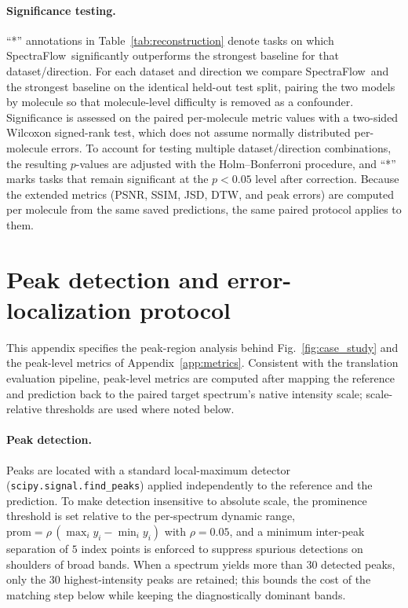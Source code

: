 \documentclass[pdflatex,sn-mathphys-num]{sn-jnl}%
\newcommand{\mname}{SpectraFlow}
\theoremstyle{thmstyleone}%
\theoremstyle{thmstyletwo}%
\theoremstyle{thmstylethree}%
\begin{document}
\begin{appendices}
\paragraph{Significance testing.} ``*'' annotations in Table~\ref{tab:reconstruction} denote tasks on which \mname\ significantly outperforms the strongest baseline for that dataset/direction. For each dataset and direction we compare \mname\ and the strongest baseline on the identical held-out test split, pairing the two models by molecule so that molecule-level difficulty is removed as a confounder. Significance is assessed on the paired per-molecule metric values with a two-sided Wilcoxon signed-rank test, which does not assume normally distributed per-molecule errors. To account for testing multiple dataset/direction combinations, the resulting $p$-values are adjusted with the Holm--Bonferroni procedure, and ``*'' marks tasks that remain significant at the $p<0.05$ level after correction. Because the extended metrics (PSNR, SSIM, JSD, DTW, and peak errors) are computed per molecule from the same saved predictions, the same paired protocol applies to them.

\section{Peak detection and error-localization protocol}\label{app:peak}
This appendix specifies the peak-region analysis behind Fig.~\ref{fig:case_study} and the peak-level metrics of Appendix~\ref{app:metrics}. Consistent with the translation evaluation pipeline, peak-level metrics are computed after mapping the reference and prediction back to the paired target spectrum's native intensity scale; scale-relative thresholds are used where noted below.

\paragraph{Peak detection.} Peaks are located with a standard local-maximum detector (\texttt{scipy.signal.find\_peaks}) applied independently to the reference and the prediction. To make detection insensitive to absolute scale, the prominence threshold is set relative to the per-spectrum dynamic range, $\mathrm{prom}=\rho\,(\max_i y_i-\min_i y_i)$ with $\rho=0.05$, and a minimum inter-peak separation of $5$ index points is enforced to suppress spurious detections on shoulders of broad bands. When a spectrum yields more than $30$ detected peaks, only the $30$ highest-intensity peaks are retained; this bounds the cost of the matching step below while keeping the diagnostically dominant bands.


\end{appendices}
\end{document}
